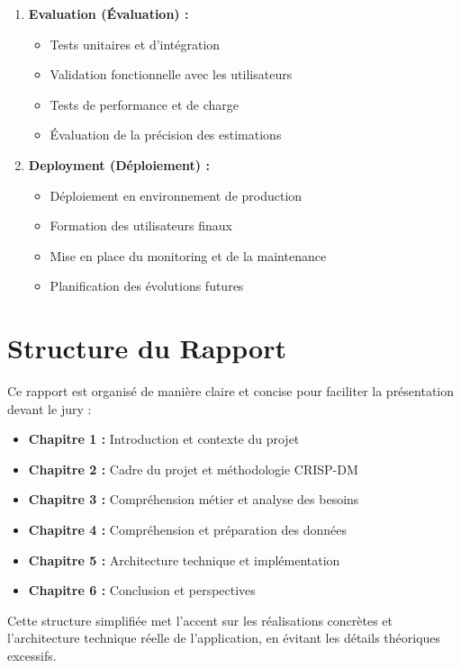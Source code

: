 \documentclass[12pt, a4paper]{report}
\begin{document}
\begin{enumerate}
    \item \textbf{Evaluation (Évaluation) :}
    \begin{itemize}
        \item Tests unitaires et d'intégration
        \item Validation fonctionnelle avec les utilisateurs
        \item Tests de performance et de charge
        \item Évaluation de la précision des estimations
    \end{itemize}
    
    \item \textbf{Deployment (Déploiement) :}
    \begin{itemize}
        \item Déploiement en environnement de production
        \item Formation des utilisateurs finaux
        \item Mise en place du monitoring et de la maintenance
        \item Planification des évolutions futures
    \end{itemize}
\end{enumerate}

\section{Structure du Rapport}

Ce rapport est organisé de manière claire et concise pour faciliter la présentation devant le jury :

\begin{itemize}
    \item \textbf{Chapitre 1 :} Introduction et contexte du projet
    \item \textbf{Chapitre 2 :} Cadre du projet et méthodologie CRISP-DM
    \item \textbf{Chapitre 3 :} Compréhension métier et analyse des besoins
    \item \textbf{Chapitre 4 :} Compréhension et préparation des données
    \item \textbf{Chapitre 5 :} Architecture technique et implémentation
    \item \textbf{Chapitre 6 :} Conclusion et perspectives
\end{itemize}

Cette structure simplifiée met l'accent sur les réalisations concrètes et l'architecture technique réelle de l'application, en évitant les détails théoriques excessifs.
\end{document}

